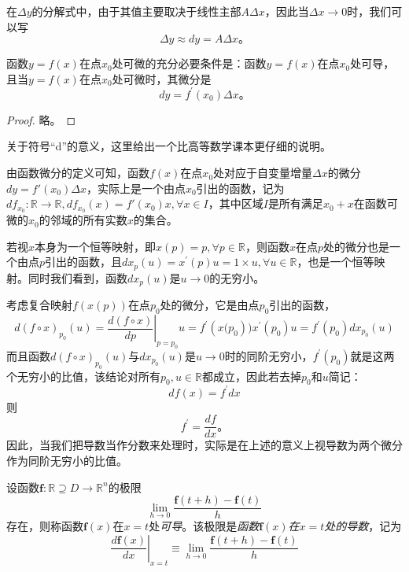 \documentclass[main.tex]{subfiles}
\begin{document}
在$\Delta y$的分解式中，由于其值主要取决于线性主部$A\Delta x$，因此当$\Delta x\to 0$时，我们可以写
\[
    \Delta y\approx dy=A\Delta x\text{。}
\]

\begin{theorem}\label{thm:II.4.5}\cite[定理2.5.1]{华工高数2009上}
    函数$y=f\left(x\right)$在点$x_0$处可微的充分必要条件是：函数$y=f\left(x\right)$在点$x_0$处可导，且当$y=f\left(x\right)$在点$x_0$处可微时，其微分是
    \[
        dy=f^\prime\left(x_0\right)\Delta x\text{。}
    \]
\end{theorem}
\begin{proof}
    略\cite[p.~103]{华工高数2009上}。
\end{proof}

关于符号“d”的意义，这里给出一个比高等数学课本\cite[p.~104]{华工高数2009上}更仔细的说明。

由函数微分的定义可知，函数$f\left(x\right)$在点$x_0$处对应于自变量增量$\Delta x$的微分$dy=f'\left(x_0\right)\Delta x$，实际上是一个由点$x_0$引出的函数，记为$df_{x_0}:\mathbb{R}\rightarrow\mathbb{R},df_{x_0}\left(x\right)=f'\left(x_0\right)x,\forall x\in I$，其中区域$I$是所有满足$x_0+x$在函数可微的$x_0$的邻域的所有实数$x$的集合。

若视$x$本身为一个恒等映射，即$x\left(p\right)=p,\forall p\in\mathbb{R}$，则函数$x$在点$p$处的微分也是一个由点$p$引出的函数，且$dx_p\left(u\right)=x^\prime\left(p\right) u=1\times u,\forall u\in\mathbb{R}$，也是一个恒等映射。同时我们看到，函数$dx_p\left(u\right)$是$u\to 0$的无穷小。

考虑复合映射$f\left(x\left(p\right)\right)$在点$p_0$处的微分，它是由点$p_0$引出的函数，\[d\left(f\circ x\right)_{p_0}\left(u\right)=\left.\frac{d\left(f\circ x\right)}{dp}\right|_{p=p_0}u=f^\prime\left(x(p_0\right))x^\prime\left(p_0\right)u=f^\prime\left(p_0\right)dx_{p_0}\left(u\right)\]
而且函数$d\left(f\circ x\right)_{p_0}\left(u\right)$与$dx_{p_0}\left(u\right)$是$u\to 0$时的同阶无穷小，$f^\prime\left(p_0\right)$就是这两个无穷小的比值，该结论对所有$p_0,u\in\mathbb{R}$都成立，因此若去掉$p_0$和$u$简记：
\[df\left(x\right)=f^\prime dx\]
则
\[f^\prime=\frac{df}{dx}\text{。}\]
因此，当我们把导数当作分数来处理时，实际是在上述的意义上视导数为两个微分作为同阶无穷小的比值。

\begin{definition}[一元向量函数的导数]\label{def:II.4.9}
    设函数$\mathbf{f}:\mathbb{R}\supseteq D\rightarrow\mathbb{R}^n$的极限
    \[
        \lim_{h\to 0}\frac{\mathbf{f}\left(t+h\right)-\mathbf{f}\left(t\right)}{h}
    \]
    存在，则称函数$\mathbf{f}\left(x\right)$在$x=t$处\emph{可导}。该极限是\emph{函数$\mathbf{f}\left(x\right)$在$x=t$处的导数}，记为
    \[
        \left.\frac{d\mathbf{f}\left(x\right)}{dx}\right|_{x=t}\equiv\lim_{h\to 0}\frac{\mathbf{f}\left(t+h\right)-\mathbf{f}\left(t\right)}{h}
    \]
\end{definition}
\end{document}
